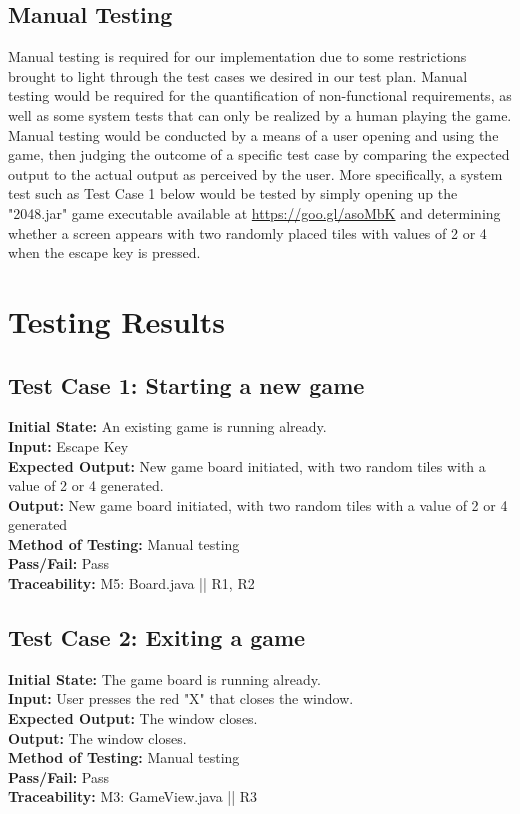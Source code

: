 \documentclass[12pt]{article}
\begin{document}
\subsection{Manual Testing}

Manual testing is required for our implementation due to some restrictions brought to light through the test cases we desired in our test plan. Manual testing would be required for the quantification of non-functional requirements, as well as some system tests that can only be realized by a human playing the game. Manual testing would be conducted by a means of a user opening and using the game, then judging the outcome of a specific test case by comparing the expected output to the actual output as perceived by the user. More specifically, a system test such as Test Case 1 below would be tested by simply opening up the "2048.jar" game executable available at \url{https://goo.gl/asoMbK} and determining whether a screen appears with two randomly placed tiles with values of 2 or 4 when the escape key is pressed.

\section{Testing Results}

\subsection{Test Case 1: Starting a new game}

\textbf{Initial State:} An existing game is running already. \\
\textbf{Input:} Escape Key\\
\textbf{Expected Output:} New game board initiated, with two random tiles with a value of 2 or 4 generated. \\
\textbf{Output:} New game board initiated, with two random tiles with a value of 2 or 4 generated \\
\textbf{Method of Testing:} Manual testing\\
\textbf{Pass/Fail:} Pass\\
\textbf{Traceability:} M5: Board.java || R1, R2

\subsection{Test Case 2: Exiting a game}

\textbf{Initial State:} The game board is running already.\\
\textbf{Input:} User presses the red "X" that closes the window.\\
\textbf{Expected Output:} The window closes.\\
\textbf{Output:} The window closes. \\
\textbf{Method of Testing:} Manual testing\\
\textbf{Pass/Fail:} Pass\\
\textbf{Traceability:} M3: GameView.java || R3
\end{document}
